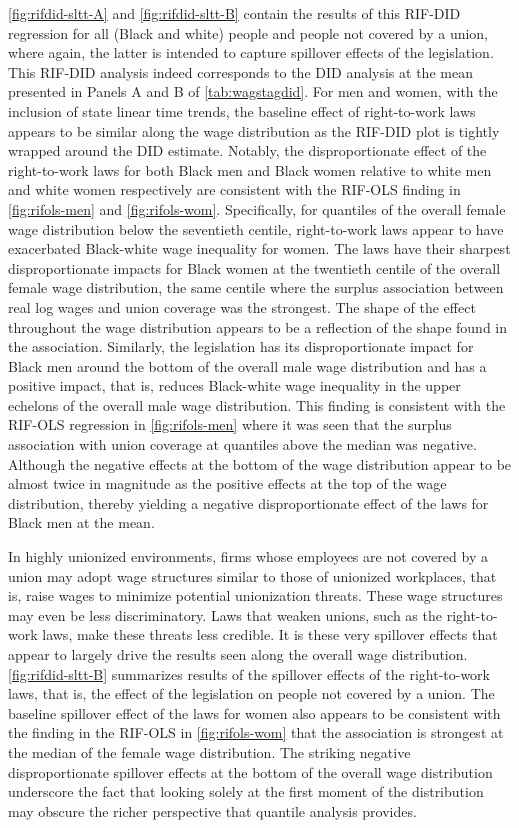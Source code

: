 \documentclass[11pt]{article}
\begin{document}
\autoref{fig:rifdid-sltt-A} and \autoref{fig:rifdid-sltt-B} contain the results of this RIF-DID regression for all (Black and white) people and people not covered by a union, where again, the latter is intended to capture spillover effects of the legislation. This RIF-DID analysis indeed corresponds to the DID analysis at the mean presented in Panels A and B of \autoref{tab:wagstagdid}. For men and women, with the inclusion of state linear time trends, the baseline effect of right-to-work laws appears to be similar along the wage distribution as the RIF-DID plot is tightly wrapped around the DID estimate. Notably, the disproportionate effect of the right-to-work laws for both Black men and Black women relative to white men and white women respectively are consistent with the RIF-OLS finding in \autoref{fig:rifols-men} and \autoref{fig:rifols-wom}. Specifically, for quantiles of the overall female wage distribution below the seventieth centile, right-to-work laws appear to have exacerbated Black-white wage inequality for women. The laws have their sharpest disproportionate impacts for Black women at the twentieth centile of the overall female wage distribution, the same centile where the surplus association between real log wages and union coverage was the strongest. The shape of the effect throughout the wage distribution appears to be a reflection of the shape found in the association. Similarly, the legislation has its disproportionate impact for Black men around the bottom of the overall male wage distribution and has a positive impact, that is, reduces Black-white wage inequality in the upper echelons of the overall male wage distribution. This finding is consistent with the RIF-OLS regression in \autoref{fig:rifols-men} where it was seen that the surplus association with union coverage at quantiles above the median was negative. Although the negative effects at the bottom of the wage distribution appear to be almost twice in magnitude as the positive effects at the top of the wage distribution, thereby yielding a negative disproportionate effect of the laws for Black men at the mean. 

In highly unionized environments, firms whose employees are not covered by a union may adopt wage structures similar to those of unionized workplaces, that is, raise wages to minimize potential unionization threats. These wage structures may even be less discriminatory. Laws that weaken unions, such as the right-to-work laws, make these threats less credible. It is these very spillover effects that appear to largely drive the results seen along the overall wage distribution. \autoref{fig:rifdid-sltt-B} summarizes results of the spillover effects of the right-to-work laws, that is, the effect of the legislation on people not covered by a union. The baseline spillover effect of the laws for women also appears to be consistent with the finding in the RIF-OLS in \autoref{fig:rifols-wom} that the association is strongest at the median of the female wage distribution. The striking negative disproportionate spillover effects at the bottom of the overall wage distribution underscore the fact that looking solely at the first moment of the distribution may obscure the richer perspective that quantile analysis provides. 
\end{document}
